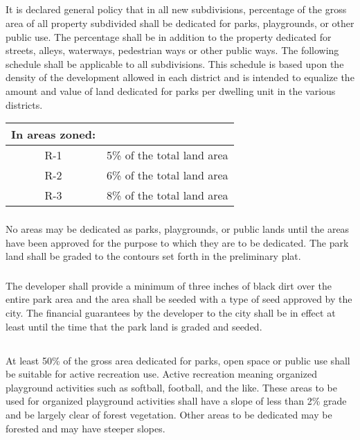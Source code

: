 \subsection{}
It is declared general policy that in all new subdivisions, percentage of the gross area of all property subdivided shall be dedicated for parks, playgrounds, or other public use. The percentage shall be in addition to the property dedicated for streets, alleys, waterways, pedestrian ways or other public ways. The following schedule shall be applicable to all subdivisions. This schedule is based upon the density of the development allowed in each district and is intended to equalize the amount and value of land dedicated for parks per dwelling unit in the various districts.
\begin{center}
    \begin{tabular}{|c|c|}
        \hline
        \textbf{In areas zoned:} & \\
        \hline
        R-1 & 5\% of the total land area\\
        \hline
        R-2 & 6\% of the total land area\\
        \hline
        R-3 & 8\% of the total land area\\
        \hline
    \end{tabular}
\end{center}
\subsubsection{}
No areas may be dedicated as parks, playgrounds, or public lands until the areas have been approved for the purpose to which they are to be dedicated. The park land shall be graded to the contours set forth in the preliminary plat.
\subsubsection{}
The developer shall provide a minimum of three inches of black dirt over the entire park area and the area shall be seeded with a type of seed approved by the city. The financial guarantees by the developer to the city shall be in effect at least until the time that the park land is graded and seeded.
\subsection{}
At least 50\% of the gross area dedicated for parks, open space or public use shall be suitable for active recreation use. Active recreation meaning organized playground activities such as softball, football, and the like. These areas to be used for organized playground activities shall have a slope of less than 2\% grade and be largely clear of forest vegetation. Other areas to be dedicated may be forested and may have steeper slopes.
